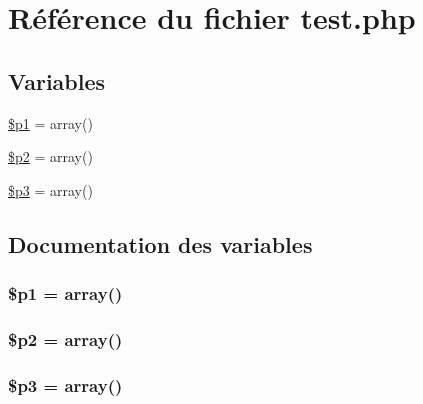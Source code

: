 \hypertarget{materiel_2test_8php}{
\section{R\'{e}f\'{e}rence du fichier test.php}
\label{materiel_2test_8php}
}
\subsection*{Variables}
\begin{CompactItemize}
\item 
\hyperlink{materiel_2test_8php_a0}{\$p1} = array()
\item 
\hyperlink{materiel_2test_8php_a1}{\$p2} = array()
\item 
\hyperlink{materiel_2test_8php_a2}{\$p3} = array()
\end{CompactItemize}


\subsection{Documentation des variables}
\hypertarget{materiel_2test_8php_a0}{
\subsubsection[\$p1]{\setlength{\rightskip}{0pt plus 5cm}\$p1 = array()}}
\label{materiel_2test_8php_a0}


\hypertarget{materiel_2test_8php_a1}{
\subsubsection[\$p2]{\setlength{\rightskip}{0pt plus 5cm}\$p2 = array()}}
\label{materiel_2test_8php_a1}


\hypertarget{materiel_2test_8php_a2}{
\subsubsection[\$p3]{\setlength{\rightskip}{0pt plus 5cm}\$p3 = array()}}
\label{materiel_2test_8php_a2}


